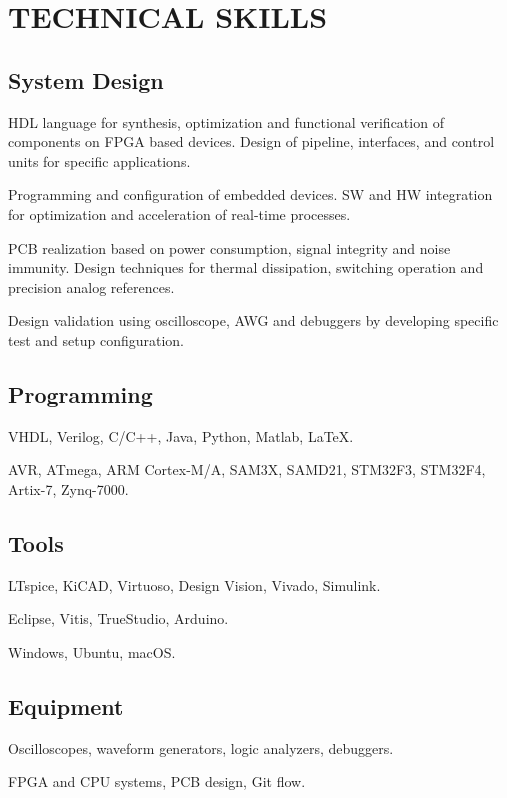 \section{TECHNICAL SKILLS}
    \subsection{System Design}
    \begin{description}[leftmargin=5mm]
        \item[-] HDL language for synthesis, optimization and functional verification of components on FPGA based devices. Design of pipeline, interfaces, and control units for specific applications.
        \item[-] Programming and configuration of embedded devices. SW and HW integration for optimization and acceleration of real-time processes.
        \item[-] PCB realization based on power consumption, signal integrity and noise immunity. Design techniques for thermal dissipation, switching operation and precision analog references.
        \item[-] Design validation using oscilloscope, AWG and debuggers by developing specific test and setup configuration.
    \end{description}
    \subsection{Programming}
    \begin{description}[leftmargin=5mm]
        \item[- Languages:] VHDL, Verilog, C/C++, Java, Python, Matlab, \LaTeX.
        \item[- Architecture:] AVR, ATmega, ARM Cortex-M/A, SAM3X, SAMD21, STM32F3, STM32F4, Artix-7, Zynq-7000.
        \item[- Framework:]  
    \end{description}

    \subsection{Tools}
    \begin{description}[leftmargin=5mm]
        \item[- CAD:] LTspice, KiCAD, Virtuoso, Design Vision, Vivado, Simulink.
        \item[- IDE:] Eclipse, Vitis, TrueStudio, Arduino.
        \item[- OS:] Windows, Ubuntu, macOS.
    \end{description}

    \subsection{Equipment}
    \begin{description}[leftmargin=5mm]
        \item[- Verification:] Oscilloscopes, waveform generators, logic analyzers, debuggers.
        \item[- Development:] FPGA and CPU systems, PCB design, Git flow.
    \end{description}